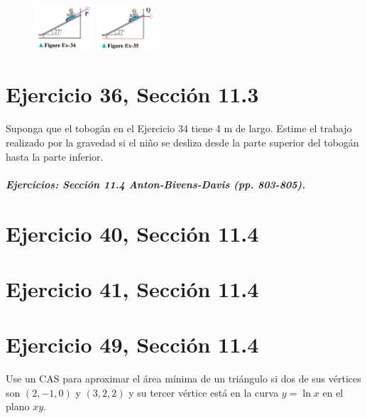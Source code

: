 \documentclass[11pt,letterpaper]{article}
\begin{document}
\begin{figure}[h]
    \centering
    \includegraphics[width=0.2\textwidth]{imagenes/Figure_Ex-34.png}
    \hspace{5cm}
    \includegraphics[width=0.2\textwidth]{imagenes/Figure_Ex-35.png}
\end{figure}

\section{Ejercicio 36, Sección 11.3}

Suponga que el tobogán en el Ejercicio 34 tiene 4 m de largo. Estime el trabajo realizado por la gravedad si el niño se desliza desde la parte superior del tobogán hasta la parte inferior.


\subparagraph{Ejercicios: Sección 11.4 Anton-Bivens-Davis (pp. 803-805).}

\section{Ejercicio 40, Sección 11.4}

\section{Ejercicio 41, Sección 11.4}

\section{Ejercicio 49, Sección 11.4}
Use un CAS para aproximar el área mínima de un triángulo si dos de sus vértices son $(2, -1, 0)$ y $(3, 2, 2)$ y su tercer vértice está en la curva $y = \ln x$ en el plano $xy$.
\end{document}
